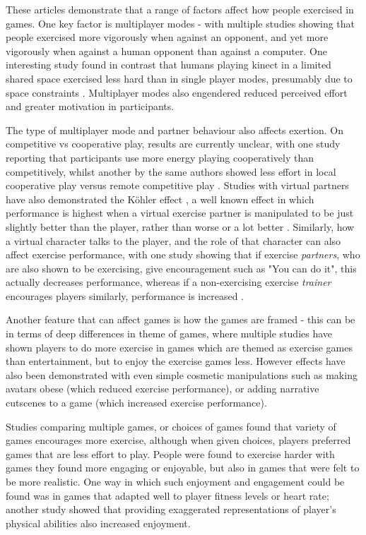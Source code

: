 These articles demonstrate that a range of factors affect how people exercised in games. One key factor is multiplayer modes - with multiple studies showing that people exercised more vigorously when against an opponent, and yet more vigorously when against a human opponent than against a computer. One interesting study found in contrast that humans playing kinect in a limited shared space exercised less hard than in single player modes, presumably due to space constraints \cite{Peng2013PlayingExertion}. Multiplayer modes also engendered reduced perceived effort and greater motivation in participants. 

The type of multiplayer mode and partner behaviour also affects exertion. On competitive vs cooperative play, results are currently unclear, with one study \cite{Peng2012TheGame} reporting that participants use more energy playing  cooperatively than competitively, whilst another by the same authors showed less effort in local cooperative play versus remote competitive play \cite{Peng2013PlayingExertion}. Studies with virtual partners have also demonstrated the Köhler effect \cite{witte1989kohler}, a well known effect in which performance is highest when a virtual exercise partner is manipulated to be just slightly better than the player, rather than worse or a lot better \cite{Feltz2012TwoPlayerActivity}. Similarly, how a virtual character talks to the player, and the role of that character can also affect exercise performance, with one study showing that if exercise \textit{partners}, who are also shown to be exercising, give encouragement such as "You can do it", this actually decreases performance, whereas if a non-exercising exercise \textit{trainer} encourages players similarly, performance is increased \cite{Max_2016}.

Another feature that can affect games is how the games are framed - this can be in terms of deep differences in theme of games, where multiple studies have shown players to do more exercise in games which are themed as exercise games than entertainment, but to enjoy the exercise games less. However effects have also been demonstrated with even simple cosmetic manipulations such as making avatars obese (which reduced exercise performance), or adding narrative cutscenes to a game (which increased exercise performance).

Studies comparing multiple games, or choices of games found that variety of games encourages more exercise, although when given choices, players preferred games that are less effort to play. People were found to exercise harder with games they found more engaging or enjoyable, but also in games that were felt to be more realistic. One way in which such enjoyment and engagement could be found was in games that adapted well to player fitness levels or heart rate; another study showed that providing exaggerated representations of player's physical abilities also increased enjoyment.

